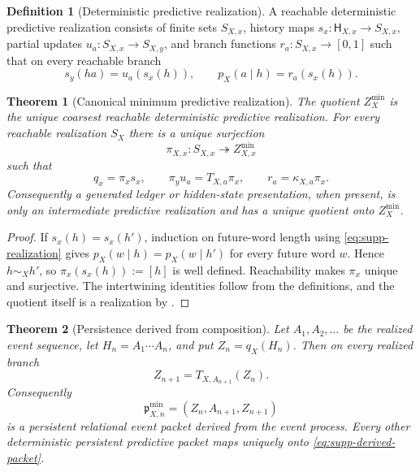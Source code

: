 \documentclass[11pt]{article}
\newtheorem{theorem}{Theorem}[section]
\numberwithin{equation}{section}
\theoremstyle{definition}
\newtheorem{definition}[definition]{Definition}
\theoremstyle{remark}
\begin{document}
\begin{definition}[Deterministic predictive realization]
\label{def:supp-predictive-realization}
A reachable deterministic predictive realization consists of finite sets
$S_{X,x}$, history maps $s_x:\mathsf H_{X,x}\to S_{X,x}$, partial updates
$u_a:S_{X,x}\to S_{X,y}$, and branch functions
$r_a:S_{X,x}\to[0,1]$ such that on every reachable branch
\begin{equation}
 s_y(ha)=u_a(s_x(h)),
 \qquad
 p_X(a\mid h)=r_a(s_x(h)).
 \label{eq:supp-realization}
\end{equation}
\end{definition}

\begin{theorem}[Canonical minimum predictive realization]
\label{thm:supp-minimal-record}
The quotient $Z_X^{\min}$ is the unique coarsest reachable deterministic
predictive realization.  For every reachable realization $S_X$ there is a
unique surjection
\begin{equation}
 \pi_{X,x}:S_{X,x}\twoheadrightarrow Z_{X,x}^{\min}
 \label{eq:supp-universal-surjection}
\end{equation}
such that
\begin{equation}
 q_x=\pi_xs_x,
 \qquad
 \pi_yu_a=T_{X,a}\pi_x,
 \qquad
 r_a=\kappa_{X,a}\pi_x.
 \label{eq:supp-universal-intertwining}
\end{equation}
Consequently a generated ledger or hidden-state presentation, when present,
is only an intermediate predictive realization and has a unique quotient onto
$Z_X^{\min}$.
\end{theorem}

\begin{proof}
If $s_x(h)=s_x(h')$, induction on future-word length using
\eqref{eq:supp-realization} gives $p_X(w\mid h)=p_X(w\mid h')$ for every
future word $w$.  Hence $h\sim_Xh'$, so
$\pi_x(s_x(h)):=[h]$ is well defined.  Reachability makes $\pi_x$ unique and
surjective.  The intertwining identities follow from the definitions, and the
quotient itself is a realization by
.
\end{proof}

\begin{theorem}[Persistence derived from composition]
\label{thm:supp-persistence-derived}
Let $A_1,A_2,\ldots$ be the realized event sequence, let
$H_n=A_1\cdots A_n$, and put $Z_n=q_X(H_n)$.  Then on every realized branch
\begin{equation}
 Z_{n+1}=T_{X,A_{n+1}}(Z_n).
 \label{eq:supp-persistence}
\end{equation}
Consequently
\begin{equation}
 \mathfrak p_{X,n}^{\min}=(Z_n,A_{n+1},Z_{n+1})
 \label{eq:supp-derived-packet}
\end{equation}
is a persistent relational event packet derived from the event process.  Every
other deterministic persistent predictive packet maps uniquely onto
\eqref{eq:supp-derived-packet}.
\end{theorem}
\end{document}
